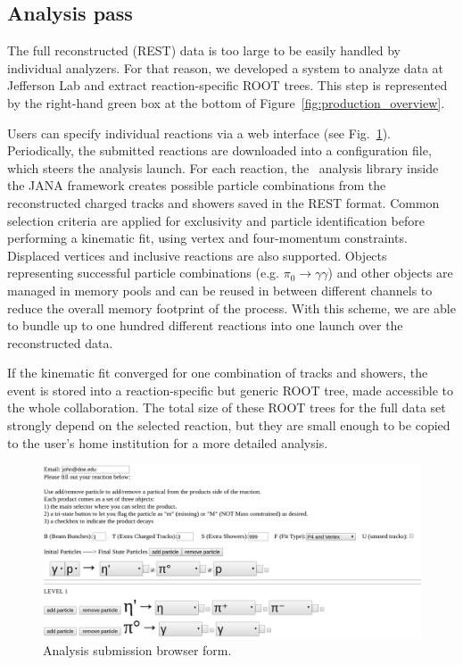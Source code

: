 \subsection{Analysis pass \label{sec:recanalysis}}

The full reconstructed (REST) data is too large to be easily handled by individual analyzers. For that reason, we developed a system to analyze data at Jefferson Lab and extract reaction-specific ROOT trees. This step is represented by the right-hand green box at the bottom of Figure~\ref{fig:production_overview}.

Users can specify individual reactions via a web interface (see Fig.~\ref{fig:production_analysis}). Periodically, the submitted reactions are downloaded into a configuration file, which steers the analysis launch. For each reaction, the \GX~analysis library inside the JANA framework creates possible particle combinations from the reconstructed charged tracks and showers saved in the REST format. Common selection criteria are applied for exclusivity and particle identification before performing a kinematic fit, using vertex and four-momentum constraints. Displaced vertices and inclusive reactions are also supported. Objects representing successful particle combinations (e.g. $\pi_0 \rightarrow \gamma\gamma$) and other objects are managed in memory pools and can be reused in between different channels to reduce the overall memory footprint of the process. With this scheme, we are able to bundle up to one hundred different reactions into one launch over the reconstructed data.

If the kinematic fit converged for one combination of tracks and showers, the event is stored into a reaction-specific but generic ROOT tree, made accessible to the whole collaboration. The total size of these ROOT trees for the full data set strongly depend on the selected reaction, but they are small enough to be copied to the user's home institution for a more detailed analysis.

\begin{figure}[h!]\centering
\includegraphics[width=\textwidth]{figures/analysis_submit_form.png}
\caption[]{\label{fig:production_analysis}Analysis submission browser form.} 
\end{figure}